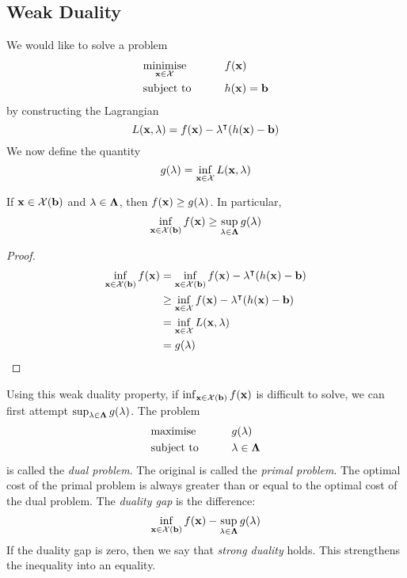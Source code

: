 \subsection{Weak Duality}
We would like to solve a problem
\begin{alignat*}{2}
	 & \underset{\vb x \in \mathcal X}{\text{minimise}} & \qquad & f(\vb x)         \\
	 & \text{subject to}                                &        & h(\vb x) = \vb b
\end{alignat*}
by constructing the Lagrangian
\[
	L(\vb x, \vb \lambda) = f(\vb x) - \vb\lambda^\intercal (h(\vb x) - \vb b)
\]
We now define the quantity
\[
	g(\vb \lambda) = \inf_{\vb x \in \mathcal X} L(\vb x, \vb \lambda)
\]
\begin{theorem}
	If \( \vb x \in \mathcal X(\vb b) \) and \( \vb\lambda \in \vb\Lambda \), then \( f(\vb x) \geq g(\lambda) \).
	In particular,
	\[
		\inf_{\vb x \in \mathcal X(\vb b)} f(\vb x) \geq \sup_{\vb \lambda \in \vb \Lambda} g(\vb \lambda)
	\]
\end{theorem}
\begin{proof}
	\begin{align*}
		\inf_{\vb x \in \mathcal X(\vb b)} f(\vb x) & = \inf_{\vb x \in \mathcal X(\vb b)} f(\vb x) - \vb \lambda^\intercal (h(\vb x) - \vb b) \\
		                                            & \geq \inf_{\vb x \in \mathcal X} f(\vb x) - \vb \lambda^\intercal (h(\vb x) - \vb b)     \\
		                                            & = \inf_{\vb x \in \mathcal X} L(\vb x, \vb \lambda)                                       \\
		                                            & = g(\vb\lambda)
	\end{align*}
\end{proof}
Using this weak duality property, if \( \inf_{\vb x \in \mathcal X(\vb b)} f(\vb x) \) is difficult to solve, we can first attempt \( \sup_{\vb \lambda \in \vb \Lambda} g(\vb \lambda) \).
The problem
\begin{alignat*}{2}
	 & \text{maximise}   & \qquad & g(\vb \lambda)              \\
	 & \text{subject to} &        & \vb \lambda \in \vb \Lambda
\end{alignat*}
is called the \textit{dual problem}.
The original is called the \textit{primal problem}.
The optimal cost of the primal problem is always greater than or equal to the optimal cost of the dual problem.
The \textit{duality gap} is the difference:
\[
	\inf_{\vb x \in \mathcal X(\vb b)} f(\vb x) - \sup_{\vb \lambda \in \vb \Lambda} g(\vb \lambda)
\]
If the duality gap is zero, then we say that \textit{strong duality} holds.
This strengthens the inequality into an equality.


